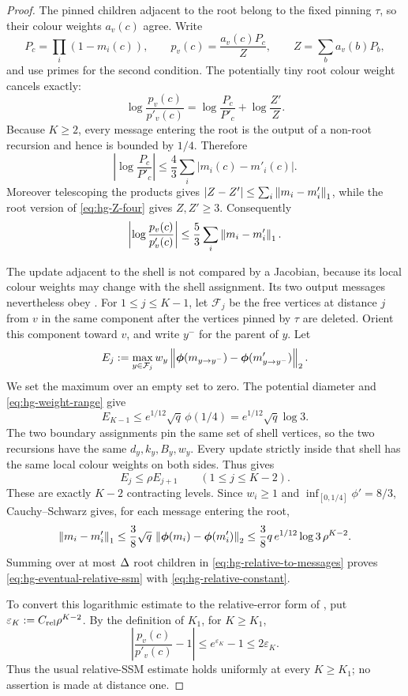 \begin{proof}
The pinned children adjacent to the root belong to the fixed pinning $\tau$,
so their colour weights \(a_v(c)\) agree.  Write
\[
 P_c=\prod_i(1-m_i(c)),\qquad
 p_v(c)=\frac{a_v(c)P_c}{Z},\qquad
 Z=\sum_b a_v(b)P_b,
\]
and use primes for the second condition.  The potentially tiny root colour
weight cancels exactly:
\begin{equation}
 \log\frac{p_v(c)}{p'_v(c)}
 =\log\frac{P_c}{P'_c}+\log\frac{Z'}Z.
 \label{eq:hg-palette-cancellation}
\end{equation}
Because $K\ge2$, every message entering the root is the output of a non-root
recursion and hence is bounded by $1/4$.  Therefore
\[
 \left|\log\frac{P_c}{P'_c}\right|
 \le\frac43\sum_i|m_i(c)-m'_i(c)|.
\]
Moreover telescoping the products gives
$|Z-Z'|\le\sum_i\left\|m_i-m'_i\right\|_1$, while the root version of
\eqref{eq:hg-Z-four} gives $Z,Z'\ge3$.  Consequently
\begin{equation}
 \left|\log\frac{p_v(c)}{p'_v(c)}\right|
 \le\frac53\sum_i\left\|m_i-m'_i\right\|_1.
 \label{eq:hg-relative-to-messages}
\end{equation}

The update adjacent to the shell is not compared by a Jacobian, because its
local colour weights may change with the shell assignment.  Its two output
messages nevertheless obey .  For
\(1\le j\le K-1\), let \(\mathcal F_j\) be the free vertices at distance
\(j\) from \(v\) in the same component after the vertices pinned by
\(\tau\) are deleted.  Orient this component toward \(v\), and write
\(y^-\) for the parent of \(y\).  Let
\[
 E_j:=
 \max_{y\in\mathcal F_j}
 w_y\left\|\boldsymbol\phi(m_{y\to y^-})
             -\boldsymbol\phi(m'_{y\to y^-})\right\|_2 .
\]
We set the maximum over an empty set to zero.
The potential diameter and \eqref{eq:hg-weight-range} give
\[
 E_{K-1}\le e^{1/12}\sqrt q\,\phi(1/4)
 =e^{1/12}\sqrt q\log3.
\]
The two boundary assignments pin the same set of shell vertices, so the two
recursions have the same \(d_y,k_y,B_y,w_y\).  Every update strictly inside
that shell has the same local colour weights on both sides.  Thus
 gives
\[
 E_j\le\rho E_{j+1}
 \qquad(1\le j\le K-2).
\]
These are exactly \(K-2\) contracting levels.  Since \(w_i\ge1\) and
\(\inf_{[0,1/4]}\phi'=8/3\), Cauchy--Schwarz gives, for each message entering
the root,
\[
 \left\|m_i-m'_i\right\|_1
 \le\frac38\sqrt q\,
       \left\|\boldsymbol\phi(m_i)-\boldsymbol\phi(m'_i)\right\|_2
 \le\frac38q\,e^{1/12}\log3\,\rho^{K-2}.
\]
Summing over at most \(\Delta\) root children in
\eqref{eq:hg-relative-to-messages} proves
\eqref{eq:hg-eventual-relative-ssm} with
\eqref{eq:hg-relative-constant}.

To convert this logarithmic estimate to the relative-error form of
\cite[Definition~5.7]{CLMM2023}, put
\(\varepsilon_K:=C_{\rm rel}\rho^{K-2}\).  By the definition of \(K_1\), for
\(K\ge K_1\),
\[
 \left|\frac{p_v(c)}{p'_v(c)}-1\right|
 \le e^{\varepsilon_K}-1\le2\varepsilon_K .
\]
Thus the usual relative-SSM estimate holds uniformly at every
$K\ge K_1$; no assertion is made at distance one.
\end{proof}

